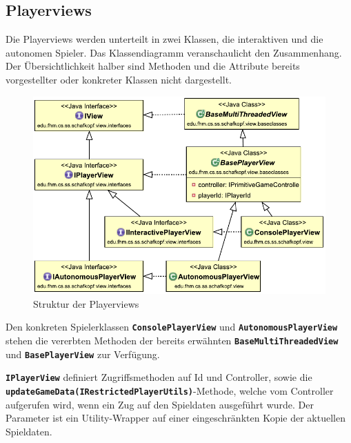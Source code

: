 \documentclass[
							a4paper, 
							11pt, 
							openany, 
							liststotoc,
							parskip=half, 
   							headings=normal
						]{scrreprt}
\begin{document}
{\clearpage

\subsection{Playerviews} \label{sse:anwendung_views_player}
Die Playerviews werden unterteilt in zwei Klassen, die interaktiven und die autonomen Spieler. Das Klassendiagramm veranschaulicht den Zusammenhang. Der Üb\-er\-sicht\-lich\-keit halber sind Methoden und die Attribute bereits vorgestellter oder konkreter Klassen nicht dargestellt.

\begin{figure}[H]
\begin{center}
    \includegraphics[width=1.0\textwidth]{./pictures/uml/class_diagram/uml_class_playerviews.pdf}
	\caption[Anwendung/View -- Struktur der Playerviews]{Struktur der Playerviews} \label{fig:views_player}
\end{center}
\end{figure}

Den konkreten Spielerklassen \textbf{\texttt{ConsolePlayerView}} und \textbf{\texttt{Au\-to\-no\-mous\-Pla\-yer\-View}} stehen die vererbten Methoden der bereits erwähnten \textbf{\texttt{Base\-Multi\-Threaded\-View}} und \textbf{\texttt{Ba\-se\-Pla\-yer\-View}} zur Verfügung.

\textbf{\texttt{IPlayerView}} definiert Zugriffsmethoden auf Id und Controller, sowie die \textbf{\texttt{update\-Game\-Data(IRes\-tric\-ted\-Pla\-yer\-Utils)}}-Methode, welche vom Controller aufgerufen wird, \newline 
wenn ein Zug auf den Spieldaten ausgeführt wurde. Der Parameter ist ein Utility-Wrapper auf einer eingeschränkten Kopie der aktuellen Spieldaten.

}
\end{document}
